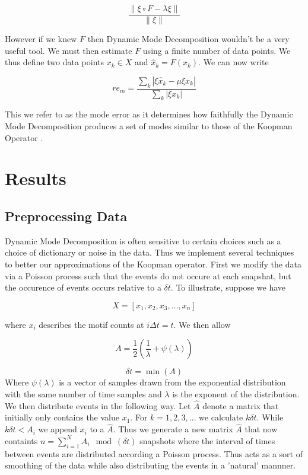 $$
\frac{\| \xi \circ F - \lambda \xi \|}{\| \xi \|}
$$

However if we knew $F$ then Dynamic Mode Decomposition wouldn't be a very useful tool.
We must then estimate $F$ using a finite number of data points. We thus define
two data points $x_k \in X$ and ${\hat x_{k}} = F(x_k)$. We can now write 

$$
re_m = \frac{\sum_{k} |\xi {\hat x_{k}} - \mu \xi {x_{k}}|}{\sum_{k} |\xi x_k |}
$$

This we refer to as the mode error as it determines how faithfully the Dynamic Mode Decomposition
produces a set of modes similar to those of the Koopman Operator \cite{Williams_2015}. 

\chapter{Results}

\section{Preprocessing Data}
Dynamic Mode Decomposition is often sensitive to certain choices such as a choice of dictionary or 
noise in the data. Thus we implement several techniques to better our approximations of the Koopman
operator. First we modify the data via a Poisson process such that the events do not occure at each
snapshat, but the occurence of events occurs relative to a $\delta t$. To illustrate, suppose we have 

$$
X = [x_1,x_2,x_3,\dots, x_n]
$$

where $x_i$ describes the motif counts at $i \Delta t = t$. We then allow

$$
A = \frac{1}{2} \left( \frac{1}{\lambda} +  \psi(\lambda) \right)
$$

$$
\delta t = \min(A)
$$
Where $\psi(\lambda)$ is a vector of samples drawn from the exponential distribution with the same number of 
time samples and $\lambda$ is the exponent of the distribution. We then distribute events in the following
way. Let ${\hat A}$ denote  a matrix that initially only contains the value $x_1$. For $k=1,2,3,\dots$ we calculate $k \delta t$. While $k\delta t < A_i$ we append $x_i$ to 
a ${\hat A}$. Thus we generate a new matrix ${\hat A}$ that now containts $n = \sum^{N}_{i=1} A_i \mod(\delta t)$ 
snapshots where the interval of times between events are distributed according a Poisson process. Thus acts as a 
sort of smoothing of the data while also distributing the events in a 'natural' mannner. 

